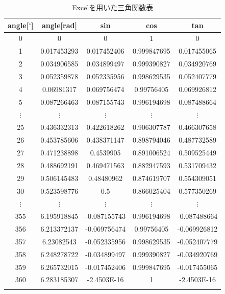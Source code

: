 \documentclass{ltjsarticle}
\begin{document}
\begin{table}[H]
    \centering
    \caption{Excelを用いた三角関数表}
    \begin{tabular}{cc|ccc}
        angle[$^\circ$]&angle[rad]&sin&cos&tan\\ \hline
        0 & 0 & 0 & 1 & 0 \\
        1 & 0.017453293 & 0.017452406 & 0.999847695 & 0.017455065 \\
        2 & 0.034906585 & 0.034899497 & 0.999390827 & 0.034920769 \\
        3 & 0.052359878 & 0.052335956 & 0.998629535 & 0.052407779 \\
        4 & 0.06981317 & 0.069756474 & 0.99756405 & 0.069926812 \\
        5 & 0.087266463 & 0.087155743 & 0.996194698 & 0.087488664 \\
        $\vdots $ & $\vdots $ & $\vdots $ & $\vdots $ & $\vdots $ \\
        25 & 0.436332313 & 0.422618262 & 0.906307787 & 0.466307658 \\
        26 & 0.453785606 & 0.438371147 & 0.898794046 & 0.487732589 \\
        27 & 0.471238898 & 0.4539905 & 0.891006524 & 0.509525449 \\
        28 & 0.488692191 & 0.469471563 & 0.882947593 & 0.531709432 \\
        29 & 0.506145483 & 0.48480962 & 0.874619707 & 0.554309051 \\
        30 & 0.523598776 & 0.5 & 0.866025404 & 0.577350269 \\
        $\vdots $ & $\vdots $ & $\vdots $ & $\vdots $ & $\vdots $ \\
        355 & 6.195918845 & -0.087155743 & 0.996194698 & -0.087488664 \\
        356 & 6.213372137 & -0.069756474 & 0.99756405 & -0.069926812 \\
        357 & 6.23082543 & -0.052335956 & 0.998629535 & -0.052407779 \\
        358 & 6.248278722 & -0.034899497 & 0.999390827 & -0.034920769 \\
        359 & 6.265732015 & -0.017452406 & 0.999847695 & -0.017455065 \\
        360 & 6.283185307 & -2.4503E-16 & 1 & -2.4503E-16 \\
        \\
    \end{tabular}
\end{table}
\end{document}

